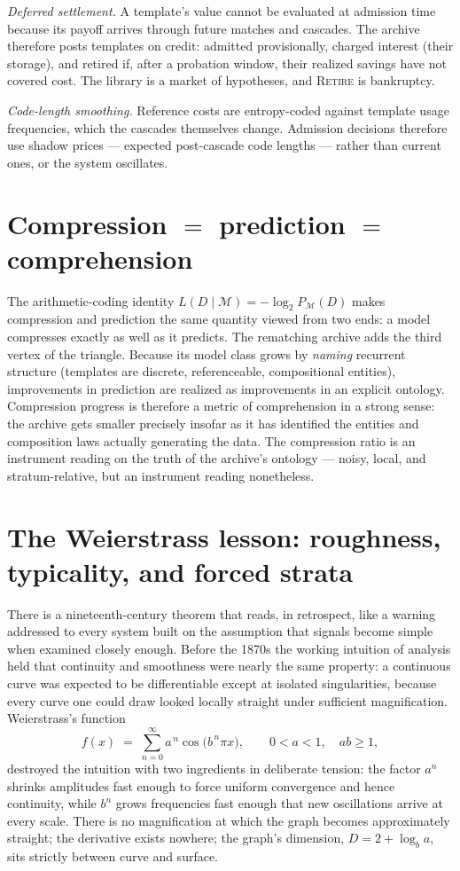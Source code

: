 \documentclass[11pt,oneside]{book}
\theoremstyle{remark}
\newcommand{\Mod}{\mathcal{M}}
\begin{document}
\emph{Deferred settlement.} A template's value cannot be evaluated at
admission time because its payoff arrives through future matches and
cascades. The archive therefore posts templates on credit: admitted
provisionally, charged interest (their storage), and retired if, after a
probation window, their realized savings have not covered cost. The
library is a market of hypotheses, and \textsc{Retire} is bankruptcy.

\emph{Code-length smoothing.} Reference costs are entropy-coded against
template usage frequencies, which the cascades themselves change.
Admission decisions therefore use shadow prices --- expected post-cascade
code lengths --- rather than current ones, or the system oscillates.

\section{Compression $=$ prediction $=$ comprehension}

The arithmetic-coding identity $L(D \mid \Mod) = -\log_2 P_{\Mod}(D)$
makes compression and prediction the same quantity viewed from two ends:
a model compresses exactly as well as it predicts. The rematching
archive adds the third vertex of the triangle. Because its model class
grows by \emph{naming} recurrent structure (templates are discrete,
referenceable, compositional entities), improvements in prediction are
realized as improvements in an explicit ontology. Compression progress
is therefore a metric of comprehension in a strong sense: the archive
gets smaller precisely insofar as it has identified the entities and
composition laws actually generating the data. The compression ratio is
an instrument reading on the truth of the archive's ontology --- noisy,
local, and stratum-relative, but an instrument reading nonetheless.

\section{The Weierstrass lesson: roughness, typicality, and forced
strata}

There is a nineteenth-century theorem that reads, in retrospect, like a
warning addressed to every system built on the assumption that signals
become simple when examined closely enough. Before the 1870s the
working intuition of analysis held that continuity and smoothness were
nearly the same property: a continuous curve was expected to be
differentiable except at isolated singularities, because every curve
one could draw looked locally straight under sufficient magnification.
Weierstrass's function
\[
f(x) \;=\; \sum_{n=0}^{\infty} a^{\,n} \cos\!\bigl(b^{\,n} \pi x\bigr),
\qquad 0 < a < 1, \quad ab \ge 1,
\]
destroyed the intuition with two ingredients in deliberate tension: the
factor $a^n$ shrinks amplitudes fast enough to force uniform
convergence and hence continuity, while $b^n$ grows frequencies fast
enough that new oscillations arrive at every scale. There is no
magnification at which the graph becomes approximately straight; the
derivative exists nowhere; the graph's dimension,
$D = 2 + \log_b a$, sits strictly between curve and surface.
\end{document}
